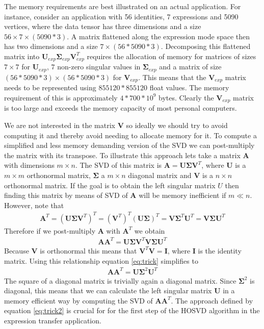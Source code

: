 \documentclass[11pt,a4paper,twoside]{report}
\begin{document}
The memory requirements are best illustrated on an actual application. For
instance, consider an application with 56 identities, 7 expressions
and 5090 vertices, where the data tensor has three dimensions and a size $56\times
7\times (5090*3)$. A
matrix flattened along the expression mode space then has two dimensions and a size
$7 \times (56*5090*3)$.  Decomposing this flattened matrix into
$\mathbf{U}_{exp} \mathbf{\Sigma}_{exp} \mathbf{V}_{exp}^T$ requires the
allocation of memory for matrices of sizes
$7\times 7$ for $\mathbf{U}_{exp}$, $7$ non-zero singular values in $\mathbf{\Sigma}_{exp}$ and a matrix of size
$(56*5090*3)\times (56*5090*3)$ for $\mathbf{V}_{exp}$. This means that the
$\mathbf{V}_{exp}$ matrix needs to be represented using $855120*855120$ float values. The memory requirement of this is approximately $4*700*10^9$
bytes. Clearly the $\mathbf{V}_{exp}$ matrix is too large and exceeds the memory capacity of
most personal computers.

We are not interested in the matrix $\mathbf{V}$ so ideally we should try to
avoid computing it and thereby avoid needing to allocate memory for it. To compute a simplified and less memory demanding version of the SVD we can
post-multiply the matrix with its transpose. To illustrate this approach lets
take a matrix $\mathbf{A}$ with dimensions $m \times n$. The SVD of this matrix
is $\mathbf{A} = \mathbf{U\Sigma V}^T$, where $\mathbf{U}$ is a $m \times m$
orthonormal matrix, $\mathbf{\Sigma}$ a $m \times n$ diagonal matrix and $\mathbf{V}$ is a $n \times n$
orthonormal matrix. If the goal is to obtain
the left singular matrix $U$ then finding this matrix by means of SVD of
$\mathbf{A}$ will be memory inefficient if $m \ll n$. However, note that 
\begin{align}
\mathbf{A}^T = (\mathbf{U\Sigma V}^T)^T = (\mathbf{V}^T)^T(\mathbf{U\Sigma})^T
= \mathbf{V}\mathbf{\Sigma}^T\mathbf{U}^T = \mathbf{V\Sigma U}^T 
\end{align}
Therefore if we post-multiply $\mathbf{A}$ with $\mathbf{A}^T$ we obtain
\begin{align}\label{eq:trick}
\mathbf{A}\mathbf{A}^T = \mathbf{U\Sigma V}^T\mathbf{V\Sigma U}^T
\end{align}
Because $\mathbf{V}$ is orthonormal this means that $\mathbf{V}^T\mathbf{V} =
\mathbf{I}$, where $\mathbf{I}$ is the identity matrix. Using this relationship
equation \ref{eq:trick} simplifies to
\begin{align}\label{eq:trick2}
\mathbf{A}\mathbf{A}^T = \mathbf{U\Sigma}^2 \mathbf{U}^T
\end{align}
The square of a diagonal matrix is trivially again a diagonal matrix. Since
$\mathbf{\Sigma}^2$ is diagonal, this means that we can calculate the left
singular matrix $\mathbf{U}$ in a memory efficient way by computing the SVD
of $\mathbf{A}\mathbf{A}^T$. The approach defined by equation \ref{eq:trick2} is
crucial for for the first step of the HOSVD algorithm in the expression transfer
application.
\end{document}
